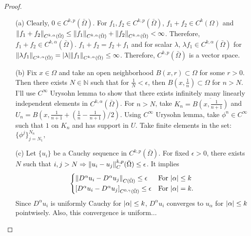 \documentclass{article}
\begin{document}
\begin{proof}
\begin{enumerate}
\item[(a)] Clearly, $0\in C^{k,p}(\bar{\Omega})$. For $f_1, f_2\in C^{k,p}(\bar{\Omega})$, $f_1+f_2\in C^k(\Omega)$ and $\norm{f_1+f_2}_{C^{k,\alpha}(\bar{\Omega})}\leq \norm{f_1}_{C^{k,\alpha}(\bar{\Omega})}+\norm{f_2}_{C^{k,\alpha}(\bar{\Omega})}< \infty$. Therefore, $f_1+f_2\in {C^{k,\alpha}(\bar{\Omega})}$. $f_1+f_2=f_2+f_1$ and for scalar $\lambda$, $\lambda f_1\in {C^{k,\alpha}(\bar{\Omega})}$ for $\norm{\lambda f_1}_{C^{k,\alpha}(\bar{\Omega})}=\abs{\lambda}\norm{f_1}_{C^{k,\alpha}(\bar{\Omega})}\leq \infty$. Therefore, $C^{k,p}(\bar{\Omega})$ is a vector space.
\item[(b)] Fix $x\in \Omega$ and take an open neighborhood $B(x,r)\subset \Omega$ for some $r>0$. Then there exists $N\in \mathbb{N}$ such that for $\frac{1}{N}<\epsilon$, then $B(x, \frac{1}{n})\subset \Omega$ for $n>N$. I'll use $C^\infty$ Urysohn lemma to show that there exists infinitely many linearly independent elements in $C^{k,\alpha}(\bar{\Omega})$. For $n>N$, take $K_n=\overline{B(x, \frac{1}{n+1})}$ and $U_n=B\left(x, \frac{1}{n+1}+\left(\frac{1}{n}-\frac{1}{n+1}\right)/2\right)$. Using $C^\infty$ Urysohn lemma, take $\phi^n\in C^\infty$ such that $1$ on $K_n$ and has support in $U$. Take finite elements in the set: $\{\phi^j\}_{j=N_1}^{N_n}$,
\item[(c)] Let $\{u_i\}$ be a Cauchy sequence in $C^{k,p}(\bar{\Omega})$. For fixed $\epsilon>0$, there exists $N$ such that $i,j>N\Rightarrow \norm{u_i-u_j}_C^{k,p}(\bar{\Omega})\leq \epsilon$. It implies
\begin{equation*}
\begin{cases}
\norm{D^\alpha u_i-D^\alpha u_j}_{C(\bar{\Omega})}\leq \epsilon & \text{For }\abs{\alpha}\leq k \\
\left[D^\alpha u_i-D^\alpha u_j\right]_{C^{0,\gamma}(\bar{\Omega})}\leq \epsilon & \text{For }\abs{\alpha}=k.
\end{cases}
\end{equation*}
Since $D^\alpha u_i$ is uniformly Cauchy for $\abs{\alpha}\leq k$, $D^\alpha u_i$ converges to $u_\alpha$ for $\abs{\alpha}\leq k$ pointwisely. Also, this convergence is uniform...
\end{enumerate}
\end{proof}
\end{document}
